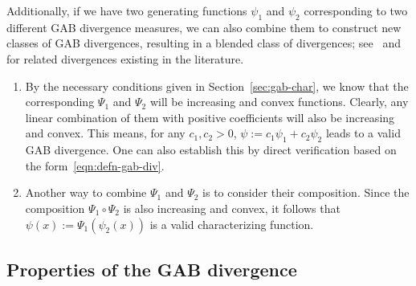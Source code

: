 \documentclass[11pt]{article}
\theoremstyle{plain}
\theoremstyle{remark}
\begin{document}
Additionally, if we have two generating functions $\psi_1$ and $\psi_2$ corresponding to two different GAB divergence measures, we can also combine them to construct new classes of GAB divergences, resulting in a blended class of divergences; see~\cite{kuus2003blended} and~\cite{kuchibhotla2019statistical} for related divergences existing in the literature.
\begin{enumerate}
    \item By the necessary conditions given in Section~\ref{sec:gab-char}, we know that the corresponding $\Psi_1$ and $\Psi_2$ will be increasing and convex functions. Clearly, any linear combination of them with positive coefficients will also be increasing and convex. This means, for any $c_1, c_2 > 0$, $\psi := c_1 \psi_1 + c_2 \psi_2$ leads to a valid GAB divergence. One can also establish this by direct verification based on the form~\eqref{eqn:defn-gab-div}.
    \item Another way to combine $\Psi_1$ and $\Psi_2$ is to consider their composition. Since the composition $\Psi_1 \circ \Psi_2$ is also increasing and convex, it follows that $\psi(x) := \Psi_1(\psi_2(x))$ is a valid characterizing function.
\end{enumerate}

\subsection{Properties of the GAB divergence}\label{sec:property}
\end{document}
